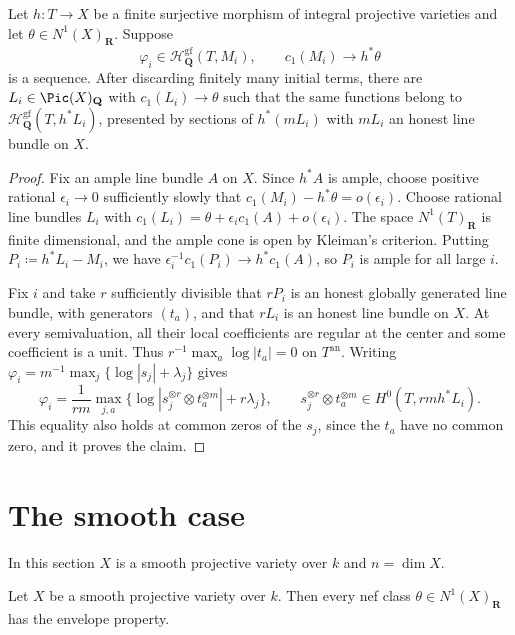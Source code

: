 \documentclass[11pt,a4paper]{article}
\newcommand{\an}{\mathrm{an}}          %
\begin{document}
\begin{lemma}\label{lem:finite-class-promotion}
Let $h\colon T\to X$ be a finite surjective morphism of integral projective varieties and let $\theta\in N^1(X)_{\mathbf R}$.  Suppose
\[
 \varphi_i\in\mathcal{H}^{\mathrm{gf}}_{\mathbf{Q}}(T,M_i),\qquad
 c_1(M_i)\longrightarrow h^*\theta
\]
is a sequence.  After discarding finitely many initial terms, there are $L_i\in\Pic(X)_{\mathbf Q}$ with $c_1(L_i)\to\theta$ such that the same functions belong to $\mathcal{H}^{\mathrm{gf}}_{\mathbf{Q}}(T,h^*L_i)$, presented by sections of $h^*(mL_i)$ with $mL_i$ an honest line bundle on $X$.
\end{lemma}

\begin{proof}
Fix an ample line bundle $A$ on $X$.  Since $h^*A$ is ample, choose positive rational $\epsilon_i\to0$ sufficiently slowly that $c_1(M_i)-h^*\theta=o(\epsilon_i)$.  Choose rational line bundles $L_i$ with $c_1(L_i)=\theta+\epsilon_i c_1(A)+o(\epsilon_i)$.  The space $N^1(T)_{\mathbf R}$ is finite dimensional, and the ample cone is open by Kleiman's criterion. Putting $P_i\coloneqq h^*L_i-M_i$, we have $\epsilon_i^{-1}c_1(P_i)\to h^*c_1(A)$, so $P_i$ is ample for all large $i$.

Fix $i$ and take $r$ sufficiently divisible that $rP_i$ is an honest globally generated line bundle, with generators $(t_a)$, and that $rL_i$ is an honest line bundle on $X$.  At every semivaluation, all their local coefficients are regular at the center and some coefficient is a unit.  Thus $r^{-1}\max_a\log|t_a|=0$ on $T^{\an}$.  Writing $\varphi_i=m^{-1}\max_j\{\log|s_j|+\lambda_j\}$ gives
\[
 \varphi_i=\frac1{rm}\max_{j,a}
 \bigl\{\log|s_j^{\otimes r}\otimes t_a^{\otimes m}|+r\lambda_j\bigr\},
 \qquad
 s_j^{\otimes r}\otimes t_a^{\otimes m}
 \in H^0(T,rmh^*L_i).
\]
This equality also holds at common zeros of the $s_j$, since the $t_a$ have no common zero, and it proves the claim.
\end{proof}

\section{The smooth case}\label{sec:smooth}

In this section $X$ is a smooth projective variety over $k$ and $n=\dim X$.

\begin{theorem}\label{thm:smooth-EP}
Let $X$ be a smooth projective variety over $k$. Then every nef class $\theta\in N^1(X)_{\mathbf{R}}$ has the envelope property.
\end{theorem}
\end{document}
